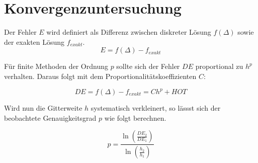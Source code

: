 \documentclass[ngerman,colorback,accentcolor=tud2d]{tudreport}
\begin{document}
\section{Konvergenzuntersuchung}
\label{sec:Konvergenzuntersuchung}

Der Fehler $E$ wird definiert als Differenz zwischen diskreter Lösung $f(\Delta)$ sowie
der exakten Lösung $f_{exakt}$.
\begin{equation*}
  E=f(\Delta) - f_{exakt}
\end{equation*}

Für finite Methoden der Ordnung $p$ sollte sich der Fehler $DE$ proportional zu
$h^p$ verhalten. Daraus folgt mit dem Proportionalitätskoeffizienten $C$:

\begin{equation*}
  DE=f(\Delta) - f_{exakt}=C h^p + HOT
\end{equation*}

Wird nun die Gitterweite $h$ systematisch verkleinert, so lässst sich der beobachtete
Genauigkeitsgrad $p$ wie folgt berechnen.

\begin{equation}
  p=\frac{\ln \left(\frac{DE_2}{DE_1}\right)}{\ln \left(\frac{h_2}{h_1}\right)}
\end{equation}

\scalebox{0.8}{}


\end{document}
